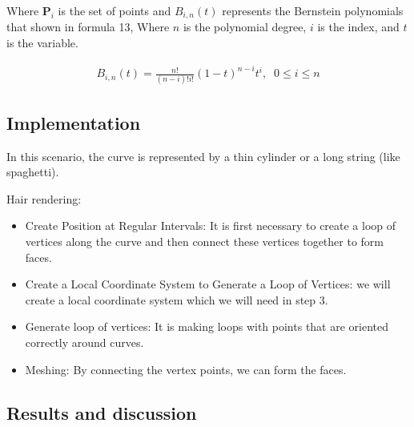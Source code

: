 \documentclass{article}
\begin{document}
	Where $  \pmb{P}_i $ is the set of points and $ B_{i,n}(t) $ represents the Bernstein polynomials that shown in formula 13, Where $ n $ is the polynomial degree, $ i $ is the index, and $ t  $ is the variable.
	
	
	
	\begin{equation}
		\begin{split}
			B_{i,n}(t) = \frac{n!}{(n - i)!i!}(1-t)^{n-i}t^i , \;\; 0 \leq i \leq n
		\end{split}		
	\end{equation}
	\subsection{Implementation}
	In this scenario, the curve is represented by a thin cylinder or a long string (like spaghetti).
	
	Hair rendering:
	\begin{itemize}
		\item Create Position at Regular Intervals:
		It is first necessary to create a loop of vertices along the curve and then connect these vertices together to form faces.
		\item Create a Local Coordinate System to Generate a Loop of Vertices: we will create a local coordinate system which we will need in step 3.
		
		\item Generate loop of vertices:
		It is making loops with points that are oriented correctly around curves.
		
		\item Meshing: By connecting the vertex points, we can form the faces.
	\end{itemize}	
	
	\subsection{Results and discussion}
	
\end{document}
